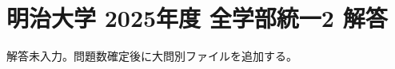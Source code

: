 \documentclass[../../uem_mat_mei_a.tex]{subfiles}
\begin{document}
    \section{明治大学 2025年度 全学部統一2 解答}

    解答未入力。問題数確定後に大問別ファイルを追加する。
\end{document}
